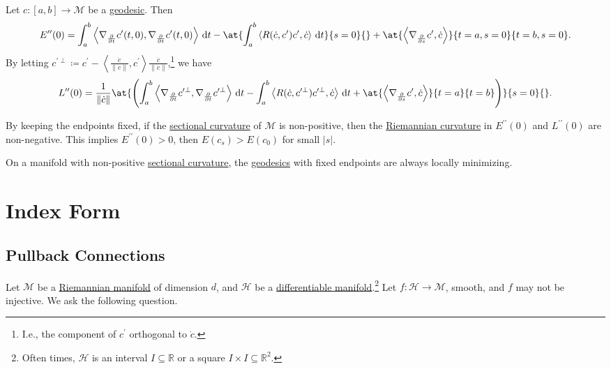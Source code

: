 \begin{theorem}\label{thm:2nd-variation-geodesic}
	Let \(c\colon [a, b] \to \mathcal{M} \) be a \hyperref[def:geodesic]{geodesic}. Then
	\[
		E^{\prime\prime}(0)
		= \int_{a}^{b} \left\langle \nabla _{\frac{\partial }{\partial t} } c^{\prime} (t, 0), \nabla _{\frac{\partial }{\partial t} } c^{\prime} (t, 0)\right\rangle  \,\mathrm{d}t
		- \at{\int_{a}^{b} \left\langle R(\dot{c} , c^{\prime} ) c^{\prime} , \dot{c} \right\rangle \,\mathrm{d}t}{s= 0}{}
		+ \at{\left\langle \nabla _{\frac{\partial }{\partial s} } c^{\prime} , \dot{c}  \right\rangle }{t=a, s=0}{t=b, s=0} .
	\]
	By letting \(c^{\prime \perp } \coloneqq c^{\prime} - \left\langle \frac{\dot{c} }{\lVert \dot{c} \rVert } , c^{\prime} \right\rangle \frac{\dot{c} }{\lVert \dot{c} \rVert} \),\footnote{I.e., the component of \(c^{\prime} \) orthogonal to \(\dot{c} \).} we have
	\[
		L^{\prime\prime} (0)
		= \frac{1}{\lVert \dot{c} \rVert } \at{\left(
		\int_{a}^{b} \left\langle \nabla _{\frac{\partial }{\partial t} } c^{\prime\perp }, \nabla _{\frac{\partial }{\partial t} } c^{\prime\perp }\right\rangle \,\mathrm{d}t
		- \int_{a}^{b} \left\langle R(\dot{c}, c^{\prime\perp } )c^{\prime\perp }, \dot{c} \right\rangle \,\mathrm{d}t
		+ \at{\left\langle \nabla _{\frac{\partial }{\partial s} }c^{\prime} , \dot{c} \right\rangle }{t=a}{t=b} \right) }{s=0}{}.
	\]
\end{theorem}

\begin{remark}
	By keeping the endpoints fixed, if the \hyperref[def:sectional-curvature]{sectional curvature} of \(\mathcal{M} \)  is non-positive, then the \hyperref[def:Riemannian-curvature]{Riemannian curvature} in \(E^{\prime\prime} (0)\) and \(L^{\prime\prime} (0)\) are non-negative. This implies \(E^{\prime\prime} (0) > 0\), then \(E(c_s) > E(c_0)\) for small \(\vert s \vert \).
\end{remark}

\begin{corollary}
	On a manifold with non-positive \hyperref[def:sectional-curvature]{sectional curvature}, the \hyperref[def:geodesic]{geodesics} with fixed endpoints are always locally minimizing.
\end{corollary}

\section{Index Form}
\subsection{Pullback Connections}
Let \(\mathcal{M} \) be a \hyperref[def:Riemannian-manifold]{Riemannian manifold} of dimension \(d\), and \(\mathcal{H} \) be a \hyperref[def:smooth-manifold]{differentiable manifold}.\footnote{Often times, \(\mathcal{H} \) is an interval \(I\subseteq \mathbb{R} \) or a square \(I\times I \subseteq \mathbb{R} ^2\).} Let \(f\colon \mathcal{H}  \to \mathcal{M} \), smooth, and \(f\) may not be injective. We ask the following question.

